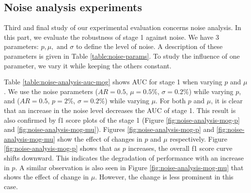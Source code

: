 \vspace{5pt}
\subsection{Noise analysis experiments}
Third and final study of our experimental evaluation concerns noise analysis. In this part, we evaluate the robustness of stage 1 against noise. We have 3 parameters: $p, \mu, \text{ and } \sigma$ to define the level of noise. A description of these parameters is given in Table \ref{table:noise-params}. To study the influence of one parameter, we vary it while keeping the others constant. 

Table \ref{table:noise-analysis-auc-mog} shows AUC for stage 1 when varying $p$ and $\mu$. We use the noise parameters ($AR=0.5$, $\mu=0.5\%$, $\sigma=0.2\%$) while varying $p$, and ($AR=0.5$, $p=2\%$, $\sigma=0.2\%$) while varying $\mu$. For both $p$ and $\mu$, it is clear that an increase in the noise level decreases the AUC of stage 1.  This result is also confirmed by f1 score plots of the stage 1 (Figure \ref{fig:noise-analysis-mog-p} and \ref{fig:noise-analysis-mog-mu}). Figures \ref{fig:noise-analysis-mog-p} and \ref{fig:noise-analysis-mog-mu} show the effect of changes in $p$ and $\mu$ respectively. Figure \ref{fig:noise-analysis-mog-p} shows that as $p$ increases, the overall f1 score curve shifts downward. This indicates the degradation of performance with an increase in $p$. A similar observation is also seen in Figure \ref{fig:noise-analysis-mog-mu} that shows the effect of change in $\mu$. However, the change is less prominent in this case.  



